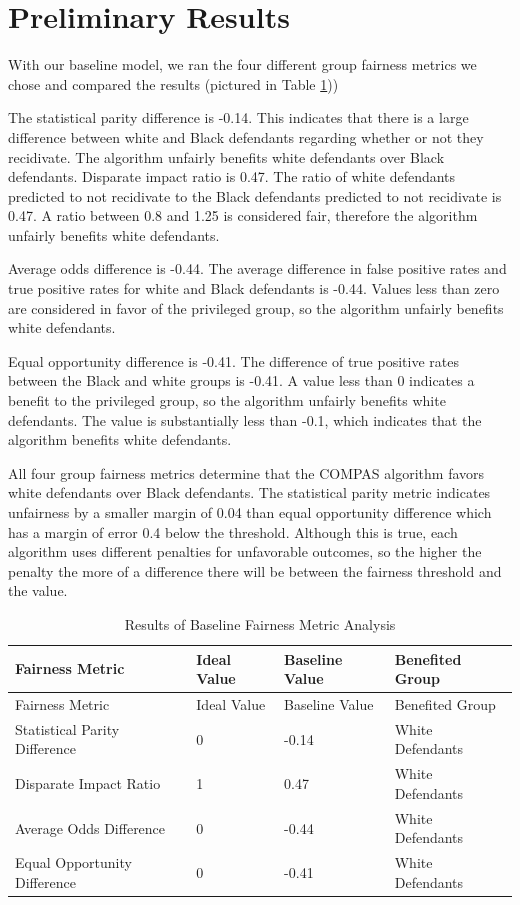 \documentclass[water,article,submit,moreauthors,pdftex]{mdpi}
\begin{document}
\hypertarget{preliminary-results}{%
\section{Preliminary Results}\label{preliminary-results}}

With our baseline model, we ran the four different group fairness
metrics we chose and compared the results (pictured in Table
\ref{tab:baseline metrics table}))

The statistical parity difference is -0.14. This indicates that there is
a large difference between white and Black defendants regarding whether
or not they recidivate. The algorithm unfairly benefits white defendants
over Black defendants. Disparate impact ratio is 0.47. The ratio of
white defendants predicted to not recidivate to the Black defendants
predicted to not recidivate is 0.47. A ratio between 0.8 and 1.25 is
considered fair, therefore the algorithm unfairly benefits white
defendants.

Average odds difference is -0.44. The average difference in false
positive rates and true positive rates for white and Black defendants is
-0.44. Values less than zero are considered in favor of the privileged
group, so the algorithm unfairly benefits white defendants.

Equal opportunity difference is -0.41. The difference of true positive
rates between the Black and white groups is -0.41. A value less than 0
indicates a benefit to the privileged group, so the algorithm unfairly
benefits white defendants. The value is substantially less than -0.1,
which indicates that the algorithm benefits white defendants.

All four group fairness metrics determine that the COMPAS algorithm
favors white defendants over Black defendants. The statistical parity
metric indicates unfairness by a smaller margin of 0.04 than equal
opportunity difference which has a margin of error 0.4 below the
threshold. Although this is true, each algorithm uses different
penalties for unfavorable outcomes, so the higher the penalty the more
of a difference there will be between the fairness threshold and the
value.

\begin{longtable}[]{@{}llll@{}}
\caption{Results of Baseline Fairness Metric Analysis
\label{tab:baseline metrics table}}\tabularnewline
\toprule
Fairness Metric & Ideal Value & Baseline Value & Benefited
Group\tabularnewline
\midrule
\endfirsthead
\toprule
Fairness Metric & Ideal Value & Baseline Value & Benefited
Group\tabularnewline
\midrule
\endhead
Statistical Parity Difference & 0 & -0.14 & White
Defendants\tabularnewline
Disparate Impact Ratio & 1 & 0.47 & White Defendants\tabularnewline
Average Odds Difference & 0 & -0.44 & White Defendants\tabularnewline
Equal Opportunity Difference & 0 & -0.41 & White
Defendants\tabularnewline
\bottomrule
\end{longtable}
\end{document}
